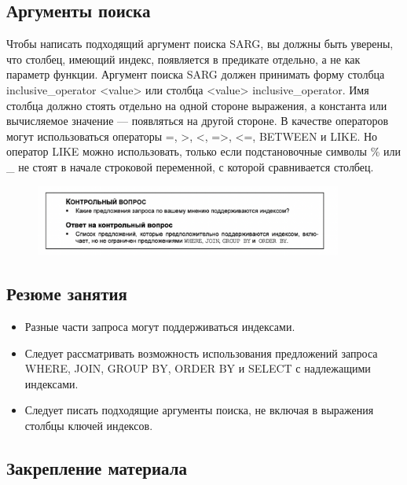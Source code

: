 \subsection{Аргументы поиска}

Чтобы написать подходящий аргумент поиска SARG, вы должны быть уверены,
что столбец, имеющий индекс, появляется в предикате отдельно, а не как параметр
функции. Аргумент поиска SARG должен принимать форму столбца inclusive\_operator <value> или столбца <value> inclusive\_operator. Имя столбца должно стоять отдельно на одной стороне выражения, а константа или вычисляемое значение — появляться на другой стороне. В качестве операторов могут использоваться операторы =, >, <, =>, <=, BETWEEN и LIKE. Но оператор LIKE можно использовать, только если подстановочные символы \% или \_ не стоят в начале строковой переменной, с которой сравнивается столбец. 

\begin{figure}[h!]
	\begin{center}
		\includegraphics[width=0.9\textwidth]{img/control43.png}
	\end{center}
	\captionsetup{justification=centering}
\end{figure}

\subsection*{Резюме занятия}
\begin{itemize}
	\item Разные части запроса могут поддерживаться индексами.
	\item Следует рассматривать возможность использования предложений запроса WHERE,
	JOIN, GROUP BY, ORDER BY и SELECT с надлежащими индексами. 
	\item Следует писать подходящие аргументы поиска, не включая в выражения столбцы ключей индексов. 
\end{itemize}


\subsection*{Закрепление материала}

